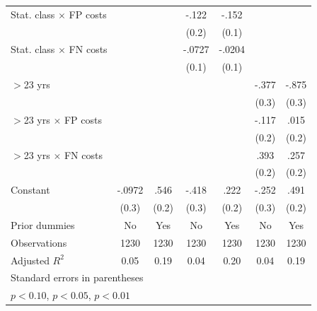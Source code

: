 \begin{table}[htbp]
\begin{tabular}{l*{6}{c}}
Stat. class $\times$ FP costs&                  &                  &    -.122         &    -.152         &                  &                  \\
                &                  &                  &    (0.2)         &    (0.1)         &                  &                  \\
Stat. class $\times$ FN costs&                  &                  &   -.0727         &   -.0204         &                  &                  \\
                &                  &                  &    (0.1)         &    (0.1)         &                  &                  \\
$>$23 yrs       &                  &                  &                  &                  &    -.377         &    -.875\sym{***}\\
                &                  &                  &                  &                  &    (0.3)         &    (0.3)         \\
$>$23 yrs $\times$ FP costs&                  &                  &                  &                  &    -.117         &     .015         \\
                &                  &                  &                  &                  &    (0.2)         &    (0.2)         \\
$>$23 yrs $\times$ FN costs&                  &                  &                  &                  &     .393\sym{**} &     .257\sym{*}  \\
                &                  &                  &                  &                  &    (0.2)         &    (0.2)         \\
Constant        &   -.0972         &     .546\sym{***}&    -.418         &     .222         &    -.252         &     .491\sym{***}\\
                &    (0.3)         &    (0.2)         &    (0.3)         &    (0.2)         &    (0.3)         &    (0.2)         \\
Prior dummies   &       No         &      Yes         &       No         &      Yes         &       No         &      Yes         \\
\hline
Observations    &     1230         &     1230         &     1230         &     1230         &     1230         &     1230         \\
Adjusted \(R^{2}\)&     0.05         &     0.19         &     0.04         &     0.20         &     0.04         &     0.19         \\
\hline\hline
\multicolumn{7}{l}{\footnotesize Standard errors in parentheses}\\
\multicolumn{7}{l}{\footnotesize \sym{*} \(p<0.10\), \sym{**} \(p<0.05\), \sym{***} \(p<0.01\)}\\
\end{tabular}
\end{table}
